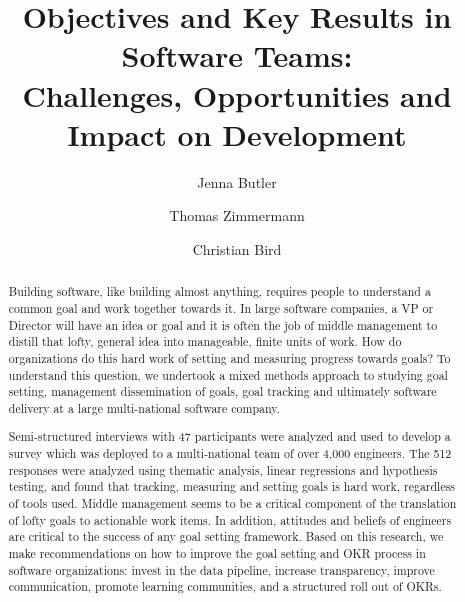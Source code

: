 \documentclass[sigconf, nonacm]{acmart}
\begin{document}
%
\title[Objectives and Key Results in Software Teams]{Objectives and Key Results in Software Teams: \\ Challenges, Opportunities and Impact on Development}

%

\author{Jenna Butler}

\author{Thomas Zimmermann}

\author{Christian Bird}


%
\renewcommand{\shortauthors}{Butler et al.}

%
\begin{abstract}
Building software, like building almost anything, requires people to understand a common goal and work together towards it. In large software companies, a VP or Director will have an idea or goal and it is often the job of middle management to distill that lofty, general idea into manageable, finite units of work. How do organizations do this hard work of setting and measuring progress towards goals? To understand this question, we undertook a mixed methods approach to studying goal setting, management dissemination of goals, goal tracking and ultimately software delivery at a large multi-national software company. \par 
Semi-structured interviews with 47 participants were analyzed and used to develop a survey which was deployed to a multi-national team of over 4,000 engineers. The 512 responses were analyzed using thematic analysis, linear regressions and hypothesis testing, and found that tracking, measuring and setting goals is hard work, regardless of tools used. Middle management seems to be a critical component of the translation of lofty goals to actionable work items. In addition, attitudes and beliefs of engineers are critical to the success of any goal setting framework.
Based on this research, we make recommendations on how to improve the goal setting and OKR process in software organizations: invest in the data pipeline, increase transparency, improve communication, promote learning communities, and a structured roll out of OKRs.
\end{abstract}
\end{document}

